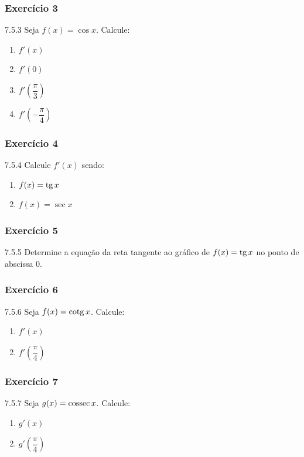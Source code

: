 \subsubsection*{Exercício 3}
\begin{exercicio}[3]{7.5.3}
Seja $f(x) = \cos x$. Calcule:
\begin{enumerate}[label=\alph*)]
    \item $f'(x)$
    \item $f'(0)$
    \item $f'\!\left(\dfrac{\pi}{3}\right)$
    \item $f'\!\left(-\dfrac{\pi}{4}\right)$
\end{enumerate}
\end{exercicio}

\subsubsection*{Exercício 4}
\begin{exercicio}[4]{7.5.4}
Calcule $f'(x)$ sendo:
\begin{enumerate}[label=\alph*)]
    \item $f(x) = \operatorname{tg} x$
    \item $f(x) = \sec x$
\end{enumerate}
\end{exercicio}

\subsubsection*{Exercício 5}
\begin{exercicio}[5]{7.5.5}
Determine a equação da reta tangente ao gráfico de $f(x) = \operatorname{tg} x$ no ponto de abscissa 0.
\end{exercicio}

\subsubsection*{Exercício 6}
\begin{exercicio}[6]{7.5.6}
Seja $f(x) = \operatorname{cotg} x$. Calcule:
\begin{enumerate}[label=\alph*)]
    \item $f'(x)$
    \item $f'\!\left(\dfrac{\pi}{4}\right)$
\end{enumerate}
\end{exercicio}

\subsubsection*{Exercício 7}
\begin{exercicio}[7]{7.5.7}
Seja $g(x) = \operatorname{cossec} x$. Calcule:
\begin{enumerate}[label=\alph*)]
    \item $g'(x)$
    \item $g'\!\left(\dfrac{\pi}{4}\right)$
\end{enumerate}
\end{exercicio}

